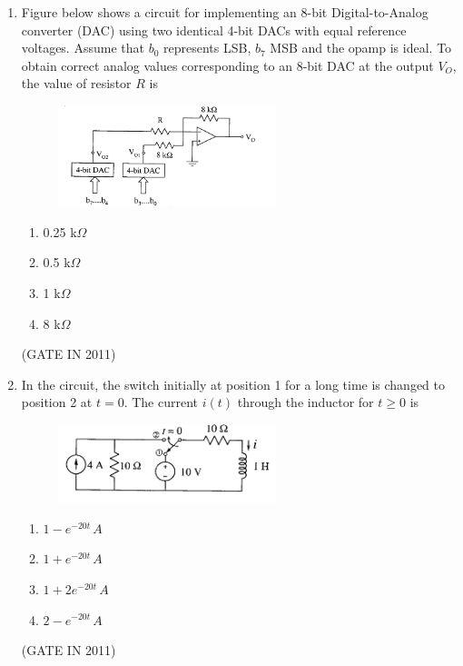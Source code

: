 \documentclass[journal]{IEEEtran}
\begin{document}
\begin{enumerate}
\item Figure below shows a circuit for implementing an 8-bit Digital-to-Analog converter (DAC) using two identical 4-bit DACs with equal reference voltages. Assume that $b_0$ represents LSB, $b_7$ MSB and the opamp is ideal. To obtain correct analog values corresponding to an 8-bit DAC at the output $V_O$, the value of resistor $R$ is
\begin{figure}[H]
    \centering
      \includegraphics[width=0.6\textwidth]{4.png} 
      \caption{}
    \label{fig:fig4} 
\end{figure}
\begin{multicols}{4}
\begin{enumerate}
\item 0.25 k$\Omega$
\item 0.5 k$\Omega$
\item 1 k$\Omega$
\item 8 k$\Omega$
\end{enumerate}
\end{multicols} \hfill(GATE IN 2011)


\item In the circuit, the switch initially at position 1 for a long time is changed to position 2 at $ t = 0 $. The current $ i(t) $ through the inductor for $ t \geq 0 $ is
\begin{figure}[H]
    \centering
      \includegraphics[width=0.6\textwidth]{5.png} 
      \caption{}
    \label{fig:fig5} 
\end{figure}
\begin{multicols}{2}
\begin{enumerate}
\item $1 - e^{-20t}\,A$  
\item $1 + e^{-20t}\,A$  
\item $1 + 2e^{-20t}\,A$  
\item $2 - e^{-20t}\,A$
\end{enumerate}
\end{multicols} \hfill(GATE IN 2011)


\end{enumerate}
\end{document}
